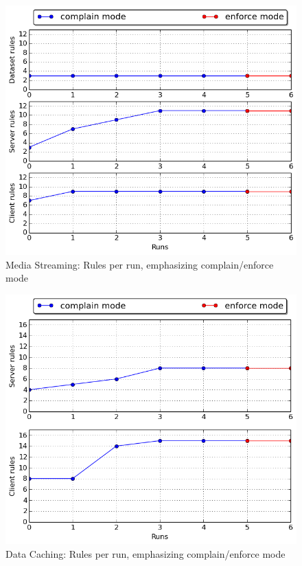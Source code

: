 \begin{figure}[h!]
  \centering
   \includegraphics[width=0.8\linewidth]{./figures/mediastreaming/complain_enforce_rules.png}
   \caption{Media Streaming: Rules per run, emphasizing complain/enforce mode}
\end{figure}

\hfill\break

\begin{figure}[h!]
  \centering
   \includegraphics[width=0.75\linewidth]{./figures/datacaching/complain_enforce_rules.png}
   \caption{Data Caching: Rules per run, emphasizing complain/enforce mode}
\end{figure}

\hfill\break

